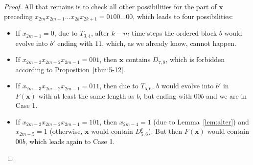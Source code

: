 \documentclass[10pt,a4paper]{amsart}
\newcommand{\bx}{\mathbf{x}}
\begin{document}
\begin{proof}
All that remains is to check all other possibilities for the part of $\bx$ preceding $x_{2m}x_{2m+1}\ldots x_{2k}x_{2k+1}=0100\ldots 00$, which leads to four possibilities:
\begin{itemize}\itemindent=15pt
    \item[Case 1:] If $x_{2m-1}=0$, due to $T_{3,4}$, after $k-m$ time steps the ordered block $b$ would evolve into $b'$ ending with $11$, which, as we already know, cannot happen.
    \item[Case 2:] If $x_{2m-3}x_{2m-2}x_{2m-1}=001$, then $\bx$ contains $D_{7,8}$, which is forbidden according to Proposition~\ref{thm:5-12}.
    \item[Case 3:] If $x_{2m-3}x_{2m-2}x_{2m-1}=011$, then due to $T_{5,6}$, $b$ would evolve into $b'$ in $F(\bx)$ with at least the same length as $b$, but ending with $00b$ and we are in Case 1.
    \item[Case 4:] If $x_{2m-3}x_{2m-2}x_{2m-1}=101$, then $x_{2m-4}=1$ (due to Lemma~\ref{lem:alter}) and $x_{2m-5}=1$ (otherwise, $\bx$ would contain $D_{5,6}^{r}$). But then $F(\bx)$ would contain $00b$, which leads again to Case 1.
\end{itemize}
\end{proof}
\end{document}
